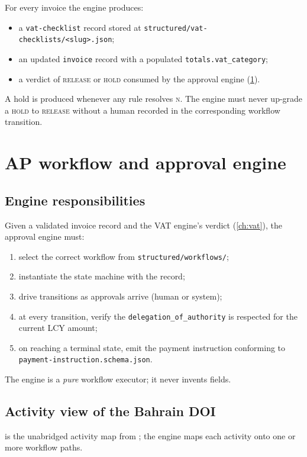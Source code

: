 \documentclass[11pt,a4paper,twoside]{report}
\newcommand{\corpus}{}
\begin{document}
For every invoice the engine produces:
\begin{itemize}
\item a \texttt{vat-checklist} record stored at
\texttt{structured/vat-checklists/<slug>.json};
\item an updated \texttt{invoice} record with a populated
\texttt{totals.vat\_category};
\item a verdict of \textsc{release} or \textsc{hold} consumed by the
approval engine (\cref{ch:ap}).
\end{itemize}

A hold is produced whenever any rule resolves \textsc{n}. The engine
must never up-grade a \textsc{hold} to \textsc{release} without a human
recorded in the corresponding workflow transition.
\chapter{AP workflow and approval engine}\label{ch:ap}

\section{Engine responsibilities}

Given a validated invoice record and the VAT engine's verdict
(\cref{ch:vat}), the approval engine must:

\begin{enumerate}
\item select the correct workflow from
\corpus\texttt{structured/workflows/};
\item instantiate the state machine with the record;
\item drive transitions as approvals arrive (human or system);
\item at every transition, verify the
\texttt{delegation\_of\_authority} is respected for the current
LCY amount;
\item on reaching a terminal state, emit the payment instruction
conforming to \texttt{payment-instruction.schema.json}.
\end{enumerate}

The engine is a \emph{pure} workflow executor; it never invents fields.

\section{Activity view of the Bahrain DOI}

 is the unabridged activity map from
\corpus{}; the
engine maps each activity onto one or more workflow paths.
\end{document}

